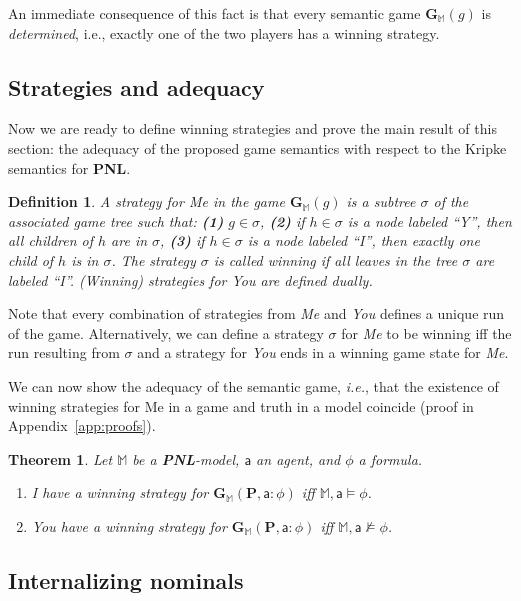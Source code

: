 \documentclass{easychair}
\newcommand{\I}{\emph{I}\xspace}
\newcommand{\You}{\emph{You}\xspace}
\newcommand{\Me}{\emph{Me}\xspace}
\newcommand\ie{\hbox{\textit{i.e.}}}
\newcommand{\M}{\mathbb{M}}
\newcommand{\ag}{\mathsf{a}}
\newtheorem{theorem}{Theorem}
\newtheorem{definition}{Definition}
\newcommand{\PNL}{\textbf{PNL}}
\begin{document}
\noindent An immediate consequence of this fact is that every semantic game $\mathbf{G}_\M(g)$ is \emph{determined}, i.e., exactly one of the two players has a winning strategy.






\subsection{Strategies and adequacy}\label{sec:adequacy}
Now we are ready to define winning strategies and prove the main result of this section:
the adequacy of the proposed game semantics with respect to the Kripke semantics for \PNL.

\begin{definition}
    A \emph{strategy} for \Me in the game $\mathbf{G}_\M(g)$ is a subtree $\sigma$ of the associated game tree such that: 
 \textbf{(1)} $g\in \sigma$,
 \textbf{(2)} if $h\in \sigma$ is a node labeled ``Y'', then all children of $h$ are in $\sigma$,
 \textbf{(3)} if $h\in \sigma$ is a node labeled ``I'', then exactly one child of $h$ is in $\sigma$.
The strategy $\sigma$ is called \emph{winning} if all leaves in the tree $\sigma$ are labeled ``I''. (Winning) strategies for \You are defined dually.
\end{definition}

Note that every combination of strategies from \Me and \You defines a unique run of the game. Alternatively, we can define a strategy $\sigma$ for \Me to be winning iff the run resulting from $\sigma$ and a strategy for \You ends in a winning game state for \Me.

We can now show the adequacy of the semantic game, \ie, that the existence of winning strategies for Me in a game and truth in a model coincide (proof in Appendix~\ref{app:proofs}).
\begin{theorem}\label{th:adequacy}
Let $\M$ be a \PNL-model, $\ag$ an agent, and $\phi$ a formula.
\begin{enumerate}
\item \I have a winning strategy for $\mathbf{G}_\M(\mathbf{P}, \ag: \phi)$ iff $\M,\ag \models \phi$. 
\item \You have a winning strategy for $\mathbf{G}_{\M}(\mathbf{P}, \ag: \phi)$ iff $\M,\ag\not \models \phi$.
\end{enumerate}
\end{theorem}

\subsection{Internalizing nominals}\label{sec:intern}
\end{document}
